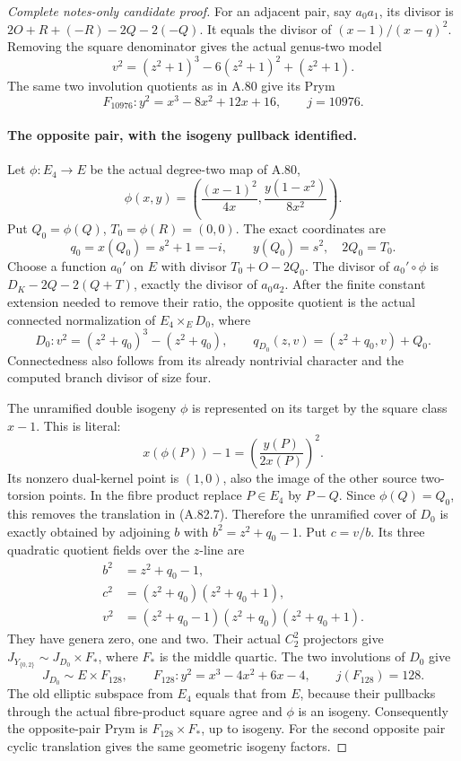 \begin{proof}[Complete notes-only candidate proof]
For an adjacent pair, say \(a_0a_1\), its divisor is
\(2O+R+(-R)-2Q-2(-Q)\). It equals the divisor of
\((x-1)/(x-q)^2\). Removing the square denominator gives the
actual genus-two model
\[
 v^2=(z^2+1)^3-6(z^2+1)^2+(z^2+1).
\]
The same two involution quotients as in A.80 give its Prym
\[
             F_{10976}:y^2=x^3-8x^2+12x+16,
                         \qquad j=10976.              \tag{A.82.5}
\]

\paragraph{The opposite pair, with the isogeny pullback identified.}
Let \(\phi:E_4\to E\) be the actual degree-two map of A.80,
\[
 \phi(x,y)=\left(\frac{(x-1)^2}{4x},
                        \frac{y(1-x^2)}{8x^2}\right).
\]
Put \(Q_0=\phi(Q)\), \(T_0=\phi(R)=(0,0)\). The exact
coordinates are
\[
           q_0=x(Q_0)=s^2+1=-i,\qquad y(Q_0)=s^2,
                              \quad 2Q_0=T_0.          \tag{A.82.6}
\]
Choose a function \(a_0'\) on \(E\) with divisor
\(T_0+O-2Q_0\). The divisor of \(a_0'\circ\phi\) is
\(D_K-2Q-2(Q+T)\), exactly the divisor of \(a_0a_2\).
After the finite constant extension needed to remove their ratio,
the opposite quotient is the actual connected normalization of
\(E_4\times_E D_0\), where
\[
 D_0:v^2=(z^2+q_0)^3-(z^2+q_0),\qquad
       q_{D_0}(z,v)=(z^2+q_0,v)+Q_0.                  \tag{A.82.7}
\]
Connectedness also follows from its already nontrivial character
and the computed branch divisor of size four.

The unramified double isogeny \(\phi\) is represented on its
target by the square class \(x-1\). This is literal:
\[
       x(\phi(P))-1=\left(\frac{y(P)}{2x(P)}\right)^2.
                                                               \tag{A.82.8}
\]
Its nonzero dual-kernel point is \((1,0)\), also the image of
the other source two-torsion points. In the fibre product replace
\(P\in E_4\) by \(P-Q\). Since \(\phi(Q)=Q_0\), this
removes the translation in (A.82.7). Therefore the unramified cover
of \(D_0\) is exactly obtained by adjoining
\(b\) with \(b^2=z^2+q_0-1\). Put \(c=v/b\). Its
three quadratic quotient fields over the \(z\)-line are
\[
 \begin{aligned}
 b^2&=z^2+q_0-1,\\
 c^2&=(z^2+q_0)(z^2+q_0+1),\\
 v^2&=(z^2+q_0-1)(z^2+q_0)(z^2+q_0+1).
 \end{aligned}                                        \tag{A.82.9}
\]
They have genera zero, one and two. Their actual \(C_2^2\)
projectors give \(J_{Y_{\{0,2\}}}\sim J_{D_0}\times F_*\),
where \(F_*\) is the middle quartic. The two involutions of
\(D_0\) give
\[
 J_{D_0}\sim E\times F_{128},\qquad
 F_{128}:y^2=x^3-4x^2+6x-4,\qquad j(F_{128})=128.
                                                               \tag{A.82.10}
\]
The old elliptic subspace from \(E_4\) equals that from \(E\),
because their pullbacks through the actual fibre-product square
agree and \(\phi\) is an isogeny. Consequently the opposite-pair
Prym is \(F_{128}\times F_*\), up to isogeny.
For the second opposite pair cyclic translation gives the same
geometric isogeny factors.


\end{proof}
